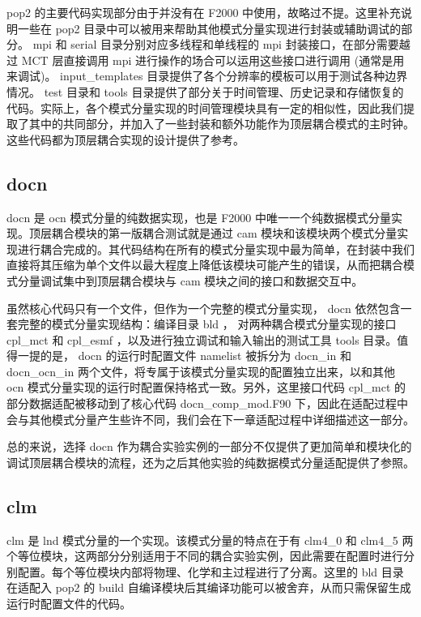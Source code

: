 pop2 的主要代码实现部分由于并没有在 F2000 中使用，故略过不提。这里补充说明一些在 pop2 目录中可以被用来帮助其他模式分量实现进行封装或辅助调试的部分。 mpi 和 serial 目录分别对应多线程和单线程的 mpi 封装接口，在部分需要越过 MCT 层直接调用 mpi 进行操作的场合可以运用这些接口进行调用 (通常是用来调试)。 input\_templates 目录提供了各个分辨率的模板可以用于测试各种边界情况。 test 目录和 tools 目录提供了部分关于时间管理、历史记录和存储恢复的代码。实际上，各个模式分量实现的时间管理模块具有一定的相似性，因此我们提取了其中的共同部分，并加入了一些封装和额外功能作为顶层耦合模式的主时钟。这些代码都为顶层耦合实现的设计提供了参考。

\subsection{docn}

docn 是 ocn 模式分量的纯数据实现，也是 F2000 中唯一一个纯数据模式分量实现。顶层耦合模块的第一版耦合测试就是通过 cam 模块和该模块两个模式分量实现进行耦合完成的。其代码结构在所有的模式分量实现中最为简单，在封装中我们直接将其压缩为单个文件以最大程度上降低该模块可能产生的错误，从而把耦合模式分量调试集中到顶层耦合模块与 cam 模块之间的接口和数据交互中。

虽然核心代码只有一个文件，但作为一个完整的模式分量实现， docn 依然包含一套完整的模式分量实现结构：编译目录 bld ， 对两种耦合模式分量实现的接口 cpl\_mct 和 cpl\_esmf ，以及进行独立调试和输入输出的测试工具 tools 目录。值得一提的是， docn 的运行时配置文件 namelist 被拆分为 docn\_in 和 docn\_ocn\_in 两个文件，将专属于该模式分量实现的配置独立出来，以和其他 ocn 模式分量实现的运行时配置保持格式一致。另外，这里接口代码 cpl\_mct 的部分数据适配被移动到了核心代码 docn\_comp\_mod.F90 下，因此在适配过程中会与其他模式分量产生些许不同，我们会在下一章适配过程中详细描述这一部分。

总的来说，选择 docn 作为耦合实验实例的一部分不仅提供了更加简单和模块化的调试顶层耦合模块的流程，还为之后其他实验的纯数据模式分量适配提供了参照。

\subsection{clm}

clm \cite{CLMdoc} \cite{CLMtech} 是 lnd 模式分量的一个实现。该模式分量的特点在于有 clm4\_0 和 clm4\_5 两个等位模块，这两部分分别适用于不同的耦合实验实例，因此需要在配置时进行分别配置。每个等位模块内部将物理、化学和主过程进行了分离。这里的 bld 目录在适配入 pop2 的 build 自编译模块后其编译功能可以被舍弃，从而只需保留生成运行时配置文件的代码。

